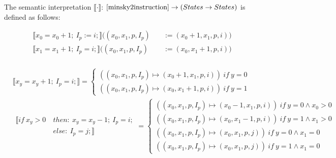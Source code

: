 \begin{definition} The semantic  interpretation 
$\llbracket \cdot \rrbracket$: $\autoref{minsky2instruction} \rightarrow (States \rightarrow States)$ is defined as follows:

\begin{align*}
 \llbracket x_0 = x_0 + 1; \ I_p := i; \rrbracket  
																		((x_0, x_1, p, I_p) &  \quad:= (x_0+1, x_1, p, i)) \\
 \llbracket x_1 = x_1 + 1; \ I_p = i; \rrbracket
																		((x_0, x_1, p, I_p) &\quad  := (x_0, x_1+1, p, i)) \\
																		\end{align*}




\begin{align*}
&\llbracket x_y = x_y + 1; \ I_p = i; \rrbracket  = \begin{cases}
																		((x_0, x_1, p, I_p) \mapsto (x_0+1, x_1, p, i))\ if \ y=0\\
																		((x_0, x_1, p, I_p) \mapsto (x_0, x_1+1, p, i))\ if \ y=1
																		\end{cases}\\
&\begin{aligned}
\llbracket if \ x_y > 0 \  &then: \ x_y = x_y - 1; \ I_p = i; \\
										&else: \ I_p = j; \rrbracket
\end{aligned} =
																		\begin{cases}
																		((x_0, x_1, p, I_p) \mapsto (x_0-1, x_1, p, i))\ if \ y=0\land x_0>0\\
																		((x_0, x_1, p, I_p) \mapsto (x_0, x_1-1, p, i))\ if \ y=1\land x_1>0\\
																		((x_0, x_1, p, I_p) \mapsto (x_0, x_1, p, j))\ if \ y=0\land x_1=0\\
																		((x_0, x_1, p, I_p) \mapsto (x_0, x_1, p, j))\ if \ y=1\land x_1=0
																		\end{cases}
\end{align*}
\end{definition}

